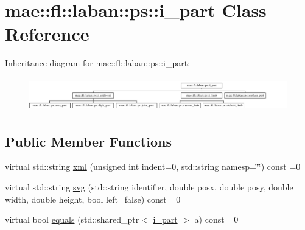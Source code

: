 \hypertarget{classmae_1_1fl_1_1laban_1_1ps_1_1i__part}{\section{mae\-:\-:fl\-:\-:laban\-:\-:ps\-:\-:i\-\_\-part Class Reference}
\label{classmae_1_1fl_1_1laban_1_1ps_1_1i__part}
}
Inheritance diagram for mae\-:\-:fl\-:\-:laban\-:\-:ps\-:\-:i\-\_\-part\-:\begin{figure}[H]
\begin{center}
\leavevmode
\includegraphics[height=1.473684cm]{classmae_1_1fl_1_1laban_1_1ps_1_1i__part}
\end{center}
\end{figure}
\subsection*{Public Member Functions}
\begin{DoxyCompactItemize}
\item 
virtual std\-::string \hyperlink{classmae_1_1fl_1_1laban_1_1ps_1_1i__part_a704c07899099cdf53beb9187f23b7874}{xml} (unsigned int indent=0, std\-::string namesp=\char`\"{}\char`\"{}) const =0
\item 
virtual std\-::string \hyperlink{classmae_1_1fl_1_1laban_1_1ps_1_1i__part_a78227d5ecd87655a7a9454c68f470368}{svg} (std\-::string identifier, double posx, double posy, double width, double height, bool left=false) const =0
\item 
virtual bool \hyperlink{classmae_1_1fl_1_1laban_1_1ps_1_1i__part_ad43f6b88cb409ac26342db51606ea1e1}{equals} (std\-::shared\-\_\-ptr$<$ \hyperlink{classmae_1_1fl_1_1laban_1_1ps_1_1i__part}{i\-\_\-part} $>$ a) const =0
\end{DoxyCompactItemize}


